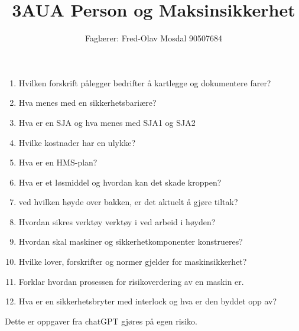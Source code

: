 \documentclass[12pt,a4paper]{article}
\begin{document}
\title{3AUA Person og Maksinsikkerhet}
\author{Faglærer: Fred-Olav Mosdal 90507684\\}
\maketitle
\begin{enumerate}
	\item Hvilken forskrift pålegger bedrifter å kartlegge og dokumentere farer?
	\item Hva menes med en sikkerhetsbariære?
	\item Hva er en SJA og hva menes med SJA1 og SJA2
	\item Hvilke kostnader har en ulykke?
	\item Hva er en HMS-plan?
	\item Hva er et løsmiddel og hvordan kan det skade kroppen?
	\item ved hvilken høyde over bakken, er det aktuelt å gjøre tiltak?
	\item Hvordan sikres verktøy verktøy i ved arbeid i høyden?
	\item Hvordan skal maskiner og sikkerhetkomponenter konstrueres?
	\item Hvilke lover, forskrifter og normer gjelder for maskinsikkerhet?
	\item Forklar hvordan prosessen for risikoverdering av en maskin er. 
	\item Hva er en sikkerhetsbryter med interlock og hva er den byddet opp av?
\end{enumerate}		
Dette er oppgaver fra chatGPT gjøres på egen risiko. 
\end{document}
